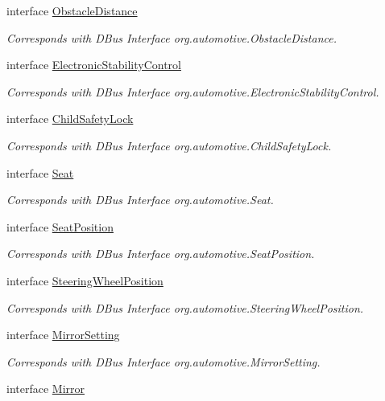 \begin{DoxyCompactItemize}
interface \hyperlink{interfaceObstacleDistance}{Obstacle\+Distance}
\begin{DoxyCompactList}\small\item\em Corresponds with D\+Bus Interface org.\+automotive.\+Obstacle\+Distance. \end{DoxyCompactList}\item 
interface \hyperlink{interfaceElectronicStabilityControl}{Electronic\+Stability\+Control}
\begin{DoxyCompactList}\small\item\em Corresponds with D\+Bus Interface org.\+automotive.\+Electronic\+Stability\+Control. \end{DoxyCompactList}\item 
interface \hyperlink{interfaceChildSafetyLock}{Child\+Safety\+Lock}
\begin{DoxyCompactList}\small\item\em Corresponds with D\+Bus Interface org.\+automotive.\+Child\+Safety\+Lock. \end{DoxyCompactList}\item 
interface \hyperlink{interfaceSeat}{Seat}
\begin{DoxyCompactList}\small\item\em Corresponds with D\+Bus Interface org.\+automotive.\+Seat. \end{DoxyCompactList}\item 
interface \hyperlink{interfaceSeatPosition}{Seat\+Position}
\begin{DoxyCompactList}\small\item\em Corresponds with D\+Bus Interface org.\+automotive.\+Seat\+Position. \end{DoxyCompactList}\item 
interface \hyperlink{interfaceSteeringWheelPosition}{Steering\+Wheel\+Position}
\begin{DoxyCompactList}\small\item\em Corresponds with D\+Bus Interface org.\+automotive.\+Steering\+Wheel\+Position. \end{DoxyCompactList}\item 
interface \hyperlink{interfaceMirrorSetting}{Mirror\+Setting}
\begin{DoxyCompactList}\small\item\em Corresponds with D\+Bus Interface org.\+automotive.\+Mirror\+Setting. \end{DoxyCompactList}\item 
interface \hyperlink{interfaceMirror}{Mirror}

\end{DoxyCompactItemize}
